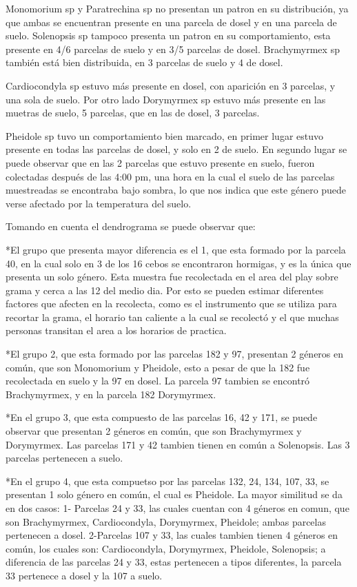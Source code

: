 \documentclass[11pt,]{article}
\begin{document}
Monomorium sp y Paratrechina sp no presentan un patron en su
distribución, ya que ambas se encuentran presente en una parcela de
dosel y en una parcela de suelo. Solenopsis sp tampoco presenta un
patron en su comportamiento, esta presente en 4/6 parcelas de suelo y en
3/5 parcelas de dosel. Brachymyrmex sp también está bien distribuida, en
3 parcelas de suelo y 4 de dosel.

Cardiocondyla sp estuvo más presente en dosel, con aparición en 3
parcelas, y una sola de suelo. Por otro lado Dorymyrmex sp estuvo más
presente en las muetras de suelo, 5 parcelas, que en las de dosel, 3
parcelas.

Pheidole sp tuvo un comportamiento bien marcado, en primer lugar estuvo
presente en todas las parcelas de dosel, y solo en 2 de suelo. En
segundo lugar se puede observar que en las 2 parcelas que estuvo
presente en suelo, fueron colectadas después de las 4:00 pm, una hora en
la cual el suelo de las parcelas muestreadas se encontraba bajo sombra,
lo que nos indica que este género puede verse afectado por la
temperatura del suelo.

Tomando en cuenta el dendrograma se puede observar que:

*El grupo que presenta mayor diferencia es el 1, que esta formado por la
parcela 40, en la cual solo en 3 de los 16 cebos se encontraron
hormigas, y es la única que presenta un solo género. Esta muestra fue
recolectada en el area del play sobre grama y cerca a las 12 del medio
dia. Por esto se pueden estimar diferentes factores que afecten en la
recolecta, como es el instrumento que se utiliza para recortar la grama,
el horario tan caliente a la cual se recolectó y el que muchas personas
transitan el area a los horarios de practica.

*El grupo 2, que esta formado por las parcelas 182 y 97, presentan 2
géneros en común, que son Monomorium y Pheidole, esto a pesar de que la
182 fue recolectada en suelo y la 97 en dosel. La parcela 97 tambien se
encontró Brachymyrmex, y en la parcela 182 Dorymyrmex.

*En el grupo 3, que esta compuesto de las parcelas 16, 42 y 171, se
puede observar que presentan 2 géneros en común, que son Brachymyrmex y
Dorymyrmex. Las parcelas 171 y 42 tambien tienen en común a Solenopsis.
Las 3 parcelas pertenecen a suelo.

*En el grupo 4, que esta compuetso por las parcelas 132, 24, 134, 107,
33, se presentan 1 solo género en común, el cual es Pheidole. La mayor
similitud se da en dos casos: 1- Parcelas 24 y 33, las cuales cuentan
con 4 géneros en comun, que son Brachymyrmex, Cardiocondyla, Dorymyrmex,
Pheidole; ambas parcelas pertenecen a dosel. 2-Parcelas 107 y 33, las
cuales tambien tienen 4 géneros en común, los cuales son: Cardiocondyla,
Dorymyrmex, Pheidole, Solenopsis; a diferencia de las parcelas 24 y 33,
estas pertenecen a tipos diferentes, la parcela 33 pertenece a dosel y
la 107 a suelo.
\end{document}
